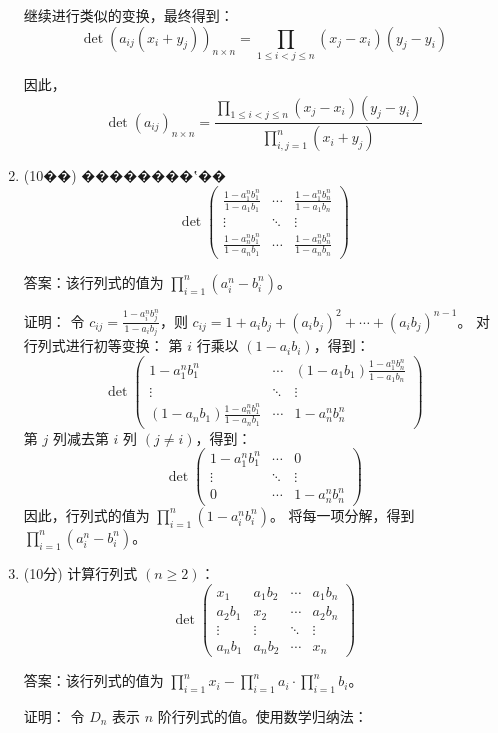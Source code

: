 \documentclass[a4paper,12pt]{article}
\begin{document}
\begin{enumerate}[leftmargin=*]
    继续进行类似的变换，最终得到：
    \[
    \det(a_{ij}(x_i+y_j))_{n\times n} = \prod_{1\leq i<j\leq n}(x_j-x_i)(y_j-y_i)
    \]
    
    因此，
    \[
    \det(a_{ij})_{n\times n} = \frac{\prod_{1\leq i<j\leq n}(x_j-x_i)(y_j-y_i)}{\prod_{i,j=1}^n(x_i+y_j)}
    \]

\item (10��) ��������ʽ��
\[
\det\begin{pmatrix}
\frac{1-a_1^nb_1^n}{1-a_1b_1} & \cdots & \frac{1-a_1^nb_n^n}{1-a_1b_n} \\
\vdots & \ddots & \vdots \\
\frac{1-a_n^nb_1^n}{1-a_nb_1} & \cdots & \frac{1-a_n^nb_n^n}{1-a_nb_n}
\end{pmatrix}
\]

答案：该行列式的值为 $\prod_{i=1}^n (a_i^n - b_i^n)$。

证明：
令 $c_{ij} = \frac{1-a_i^nb_j^n}{1-a_ib_j}$，则 $c_{ij} = 1 + a_ib_j + (a_ib_j)^2 + \cdots + (a_ib_j)^{n-1}$。
对行列式进行初等变换：
第 $i$ 行乘以 $(1-a_ib_i)$，得到：
\[
\det\begin{pmatrix}
1-a_1^nb_1^n & \cdots & (1-a_1b_1)\frac{1-a_1^nb_n^n}{1-a_1b_n} \\
\vdots & \ddots & \vdots \\
(1-a_nb_1)\frac{1-a_n^nb_1^n}{1-a_nb_1} & \cdots & 1-a_n^nb_n^n
\end{pmatrix}
\]
第 $j$ 列减去第 $i$ 列 $(j \neq i)$，得到：
\[
\det\begin{pmatrix}
1-a_1^nb_1^n & \cdots & 0 \\
\vdots & \ddots & \vdots \\
0 & \cdots & 1-a_n^nb_n^n
\end{pmatrix}
\]
因此，行列式的值为 $\prod_{i=1}^n (1-a_i^nb_i^n)$。
将每一项分解，得到 $\prod_{i=1}^n (a_i^n - b_i^n)$。

\item (10分) 计算行列式 $(n \geq 2)$：
\[
\det\begin{pmatrix}
x_1 & a_1b_2 & \cdots & a_1b_n \\
a_2b_1 & x_2 & \cdots & a_2b_n \\
\vdots & \vdots & \ddots & \vdots \\
a_nb_1 & a_nb_2 & \cdots & x_n
\end{pmatrix}
\]

答案：该行列式的值为 $\prod_{i=1}^n x_i - \prod_{i=1}^n a_i \cdot \prod_{i=1}^n b_i$。

证明：
令 $D_n$ 表示 $n$ 阶行列式的值。使用数学归纳法：


\end{enumerate}
\end{document}
